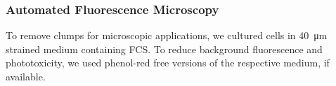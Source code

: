 

\subsubsection*{Automated Fluorescence Microscopy}
To remove clumps for microscopic applications, we cultured cells in
\SI{40}{\micro\meter} strained medium containing FCS. To reduce background
fluorescence and phototoxicity, we used phenol-red free versions of the
respective medium, if available.

